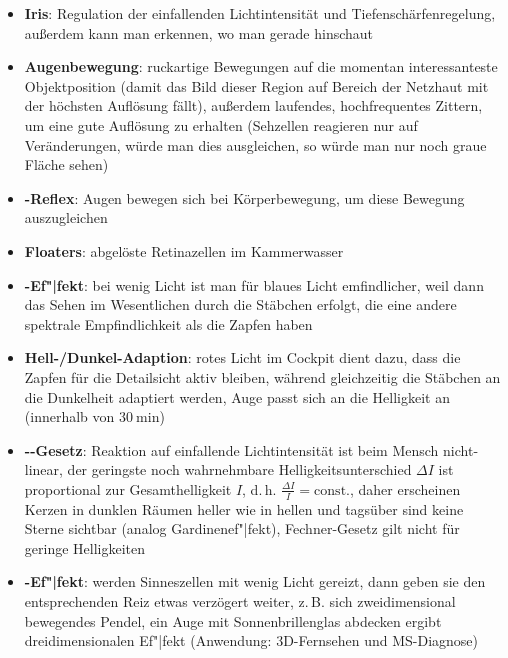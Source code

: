 \begin{itemize}
    \item
    \textbf{Iris}:
    Regulation der einfallenden Lichtintensität und Tiefenschärfenregelung,
    außerdem kann man erkennen, wo man gerade hinschaut
    
    \item
    \textbf{Augenbewegung}:
    ruckartige Bewegungen auf die momentan interessanteste Objektposition
    (damit das Bild dieser Region auf Bereich der Netzhaut mit der höchsten
    Auflösung fällt),
    außerdem laufendes, hochfrequentes Zittern, um eine gute Auflösung zu
    erhalten (Sehzellen reagieren nur auf Veränderungen, würde man dies
    ausgleichen, so würde man nur noch graue Fläche sehen)
    
    \item
    \textbf{-Reflex}:
    Augen bewegen sich bei Körperbewegung, um diese Bewegung auszugleichen
    
    \item
    \textbf{Floaters}:
    abgelöste Retinazellen im Kammerwasser
\end{itemize}
\linie
\pagebreak
\begin{itemize}
    \item
    \textbf{-Ef"|fekt}:
    bei wenig Licht ist man für blaues Licht emfindlicher, weil dann das Sehen
    im Wesentlichen durch die Stäbchen erfolgt, die eine andere spektrale
    Empfindlichkeit als die Zapfen haben
    
    \item
    \textbf{Hell-/Dunkel-Adaption}:
    rotes Licht im Cockpit dient dazu, dass die Zapfen für die Detailsicht
    aktiv bleiben, während gleichzeitig die Stäbchen an die Dunkelheit
    adaptiert werden,
    Auge passt sich an die Helligkeit an (innerhalb von $\SI{30}{\minute}$)
    
    \item
    \textbf{--Gesetz}:
    Reaktion auf einfallende Lichtintensität ist beim Mensch nicht-linear,
    der geringste noch wahrnehmbare Helligkeitsunterschied $\Delta I$
    ist proportional zur Gesamthelligkeit $I$,
    d.\,h. $\frac{\Delta I}{I} = \text{const.}$,
    daher erscheinen Kerzen in dunklen Räumen heller wie in hellen
    und tagsüber sind keine Sterne sichtbar (analog Gardinenef"|fekt),
    Fechner-Gesetz gilt nicht für geringe Helligkeiten
    
    \item
    \textbf{-Ef"|fekt}:
    werden Sinneszellen mit wenig Licht gereizt, dann geben sie den
    entsprechenden Reiz etwas verzögert weiter,
    z.\,B. sich zweidimensional bewegendes Pendel, ein Auge mit
    Sonnenbrillenglas abdecken ergibt dreidimensionalen Ef"|fekt
    (Anwendung: 3D-Fernsehen und MS-Diagnose)
\end{itemize}
